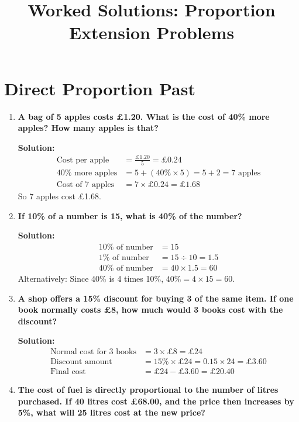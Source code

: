 \documentclass[12pt]{article}
\title{Worked Solutions: Proportion Extension Problems}
\date{}
\begin{document}
\maketitle

\section*{Direct Proportion Past}

\begin{enumerate}
    \item \textbf{A bag of 5 apples costs £1.20. What is the cost of 40\% more apples? How many apples is that?}
    
    \textbf{Solution:}
    \begin{align*}
        \text{Cost per apple} &= \frac{£1.20}{5} = £0.24 \\
        40\% \text{ more apples} &= 5 + (40\% \times 5) = 5 + 2 = 7 \text{ apples} \\
        \text{Cost of 7 apples} &= 7 \times £0.24 = £1.68
    \end{align*}
    So 7 apples cost £1.68.
    
    \item \textbf{If 10\% of a number is 15, what is 40\% of the number?}
    
    \textbf{Solution:}
    \begin{align*}
        10\% \text{ of number} &= 15 \\
        1\% \text{ of number} &= 15 \div 10 = 1.5 \\
        40\% \text{ of number} &= 40 \times 1.5 = 60
    \end{align*}
    Alternatively: Since 40\% is 4 times 10\%, \(40\% = 4 \times 15 = 60\).
    
    \item \textbf{A shop offers a 15\% discount for buying 3 of the same item. If one book normally costs £8, how much would 3 books cost with the discount?}
    
    \textbf{Solution:}
    \begin{align*}
        \text{Normal cost for 3 books} &= 3 \times £8 = £24 \\
        \text{Discount amount} &= 15\% \times £24 = 0.15 \times 24 = £3.60 \\
        \text{Final cost} &= £24 - £3.60 = £20.40
    \end{align*}
    
    \item \textbf{The cost of fuel is directly proportional to the number of litres purchased. If 40 litres cost £68.00, and the price then increases by 5\%, what will 25 litres cost at the new price?}
    

\end{enumerate}
\end{document}
